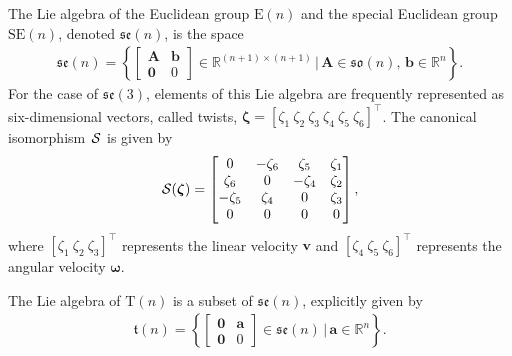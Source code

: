\begin{example}
    The Lie algebra of the Euclidean group $\text{E}(n)$ and the special Euclidean group $\text{SE}(n)$, denoted $\mathfrak{se}(n)$, is the space
    \begin{align*}
        \mathfrak{se}(n) = \left\{\begin{bmatrix}
            \mathbf{A} & \mathbf{b} \\ \mathbf{0} & 0
        \end{bmatrix} \in \mathbb{R}^{(n+1)\times(n+1)} \,\biggl|\, \mathbf{A}\in\mathfrak{so}(n),\, \mathbf{b}\in\mathbb{R}^n\right\}.
    \end{align*}
    For the case of $\mathfrak{se}(3)$, elements of this Lie algebra are frequently represented as six-dimensional vectors, called twists, $\boldsymbol{\zeta} = [\zeta_1\ \zeta_2\ \zeta_3\ \zeta_4\ \zeta_5\ \zeta_6]^\top$. The canonical isomorphism $\SL$ is given by
    \begin{align*}
        \SL[\boldsymbol{\zeta}] = \begin{bmatrix}
            0 & -\zeta_6 & \zeta_5 & \zeta_1 \\
            \zeta_6 & 0 & -\zeta_4 & \zeta_2 \\
            -\zeta_5 & \zeta_4 & 0 & \zeta_3 \\
            0 & 0 & 0 & 0
        \end{bmatrix},
    \end{align*}
    where $[\zeta_1\ \zeta_2\ \zeta_3]^\top$ represents the linear velocity $\mathbf{v}$ and $[\zeta_4\ \zeta_5\ \zeta_6]^\top$ represents the angular velocity $\boldsymbol{\omega}$.
\end{example}
\begin{example}
    The Lie algebra of $\text{T}(n)$ is a subset of $\mathfrak{se}(n)$, explicitly given by
    \begin{align*}
        \mathfrak{t}(n) = \left\{\begin{bmatrix}
            \mathbf{0} & \mathbf{a} \\ \mathbf{0} & 0
        \end{bmatrix} \in \mathfrak{se}(n) \,\biggl|\, \mathbf{a}\in\mathbb{R}^n\right\}.
    \end{align*} 
\end{example}
